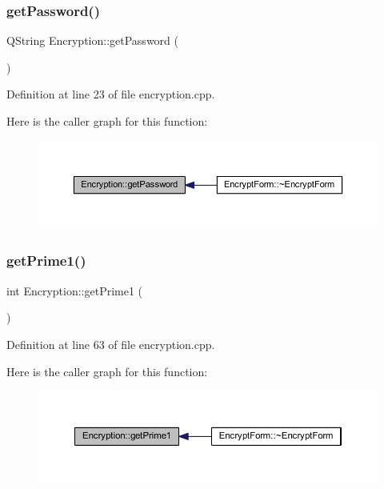 \subsubsection{\texorpdfstring{get\+Password()}{getPassword()}}
{\footnotesize\ttfamily Q\+String Encryption\+::get\+Password (\begin{DoxyParamCaption}{ }\end{DoxyParamCaption})}



Definition at line 23 of file encryption.\+cpp.

Here is the caller graph for this function\+:\nopagebreak
\begin{figure}[H]
\begin{center}
\leavevmode
\includegraphics[width=350pt]{class_encryption_a55e34ee5668779c478f5771d24c2b183_icgraph}
\end{center}
\end{figure}
\hypertarget{class_encryption_af133b980f6daf0548a7097623ed35b10}{}\label{class_encryption_af133b980f6daf0548a7097623ed35b10} 
\subsubsection{\texorpdfstring{get\+Prime1()}{getPrime1()}}
{\footnotesize\ttfamily int Encryption\+::get\+Prime1 (\begin{DoxyParamCaption}{ }\end{DoxyParamCaption})}



Definition at line 63 of file encryption.\+cpp.

Here is the caller graph for this function\+:\nopagebreak
\begin{figure}[H]
\begin{center}
\leavevmode
\includegraphics[width=350pt]{class_encryption_af133b980f6daf0548a7097623ed35b10_icgraph}
\end{center}
\end{figure}
\hypertarget{class_encryption_ab4089ae7185f6c10fcea6b6d697872c2}{}\label{class_encryption_ab4089ae7185f6c10fcea6b6d697872c2} 

